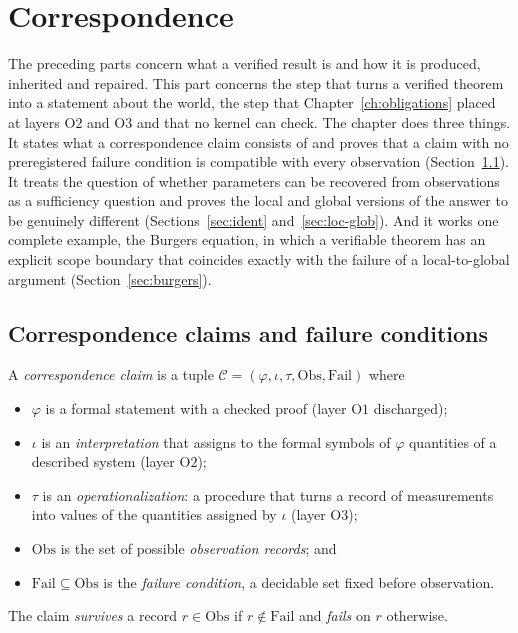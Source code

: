 \chapter{Correspondence}
\label{ch:correspondence}

The preceding parts concern what a verified result is and how it is produced, inherited and repaired. This part concerns the step that turns a verified theorem into a statement about the world, the step that Chapter~\ref{ch:obligations} placed at layers $\mathrm O2$ and $\mathrm O3$ and that no kernel can check. The chapter does three things. It states what a correspondence claim consists of and proves that a claim with no preregistered failure condition is compatible with every observation (Section~\ref{sec:claims}). It treats the question of whether parameters can be recovered from observations as a sufficiency question and proves the local and global versions of the answer to be genuinely different (Sections~\ref{sec:ident} and~\ref{sec:loc-glob}). And it works one complete example, the Burgers equation, in which a verifiable theorem has an explicit scope boundary that coincides exactly with the failure of a local-to-global argument (Section~\ref{sec:burgers}).

\section{Correspondence claims and failure conditions}
\label{sec:claims}

\begin{definition}
\label{def:corr-claim}
A \emph{correspondence claim} is a tuple $\mathcal C=(\varphi,\iota,\tau,\mathrm{Obs},\mathrm{Fail})$ where
\begin{itemize}[nosep]
\item $\varphi$ is a formal statement with a checked proof (layer $\mathrm O1$ discharged);
\item $\iota$ is an \emph{interpretation} that assigns to the formal symbols of $\varphi$ quantities of a described system (layer $\mathrm O2$);
\item $\tau$ is an \emph{operationalization}: a procedure that turns a record of measurements into values of the quantities assigned by $\iota$ (layer $\mathrm O3$);
\item $\mathrm{Obs}$ is the set of possible \emph{observation records}; and
\item $\mathrm{Fail}\subseteq\mathrm{Obs}$ is the \emph{failure condition}, a decidable set fixed before observation.
\end{itemize}
The claim \emph{survives} a record $r\in\mathrm{Obs}$ if $r\notin\mathrm{Fail}$ and \emph{fails} on $r$ otherwise.
\end{definition}


